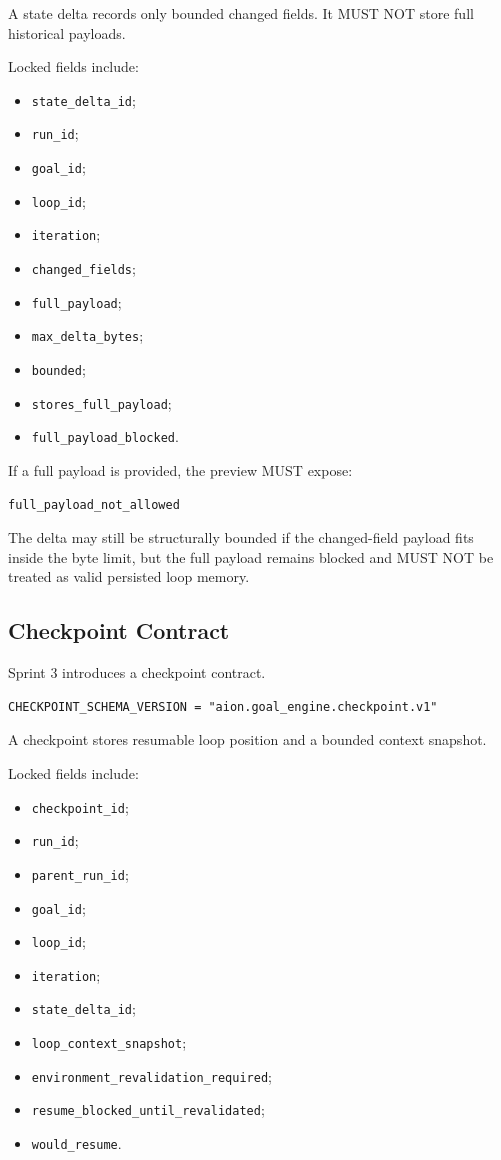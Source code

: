 A state delta records only bounded changed fields. It MUST NOT store full historical payloads.

Locked fields include:

\begin{itemize}
  \item \texttt{state_delta_id};
  \item \texttt{run_id};
  \item \texttt{goal_id};
  \item \texttt{loop_id};
  \item \texttt{iteration};
  \item \texttt{changed_fields};
  \item \texttt{full_payload};
  \item \texttt{max_delta_bytes};
  \item \texttt{bounded};
  \item \texttt{stores_full_payload};
  \item \texttt{full_payload_blocked}.
\end{itemize}

If a full payload is provided, the preview MUST expose:

\begin{verbatim}
full_payload_not_allowed
\end{verbatim}

The delta may still be structurally bounded if the changed-field payload fits inside the byte limit, but the full payload remains blocked and MUST NOT be treated as valid persisted loop memory.

\subsection{Checkpoint Contract}

Sprint 3 introduces a checkpoint contract.

\begin{verbatim}
CHECKPOINT_SCHEMA_VERSION = "aion.goal_engine.checkpoint.v1"
\end{verbatim}

A checkpoint stores resumable loop position and a bounded context snapshot.

Locked fields include:

\begin{itemize}
  \item \texttt{checkpoint_id};
  \item \texttt{run_id};
  \item \texttt{parent_run_id};
  \item \texttt{goal_id};
  \item \texttt{loop_id};
  \item \texttt{iteration};
  \item \texttt{state_delta_id};
  \item \texttt{loop_context_snapshot};
  \item \texttt{environment_revalidation_required};
  \item \texttt{resume_blocked_until_revalidated};
  \item \texttt{would_resume}.
\end{itemize}

